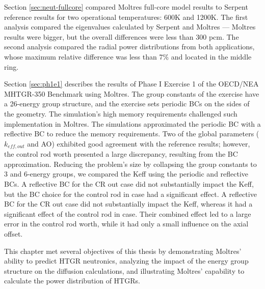 Section \ref{sec:neut-fullcore} compared Moltres full-core model results to Serpent reference results for two operational temperatures: 600K and 1200K.
The first analysis compared the eigenvalues calculated by Serpent and Moltres --- Moltres results were bigger, but the overall differences were less than 300 pcm.
The second analysis compared the radial power distributions from both applications, whose maximum relative difference was less than 7\% and located in the middle ring.

Section \ref{sec:ph1e1} describes the results of Phase I Exercise 1 of the OECD/NEA MHTGR-350 Benchmark using Moltres.
The group constants of the exercise have a 26-energy group structure, and the exercise sets periodic \glspl{BC} on the sides of the geometry.
The simulation's high memory requirements challenged such implementation in Moltres.
The simulations approximated the periodic BC with a reflective BC to reduce the memory requirements.
Two of the global parameters ($k_{eff,out}$ and AO) exhibited good agreement with the reference results; however, the control rod worth presented a large discrepancy, resulting from the BC approximation.
Reducing the problem's size by collapsing the group constants to 3 and 6-energy groups, we compared the \gls{Keff} using the periodic and reflective BCs.
A reflective BC for the \gls{CR} out case did not substantially impact the \gls{Keff}, but the BC choice for the control rod in case had a significant effect.
A reflective BC for the \gls{CR} out case did not substantially impact the \gls{Keff}, whereas it had a significant effect of the control rod in case.
Their combined effect led to a large error in the control rod worth, while it had only a small influence on the axial offset.

This chapter met several objectives of this thesis by demonstrating Moltres' ability to predict HTGR neutronics, analyzing the impact of the energy group structure on the diffusion calculations, and illustrating Moltres' capability to calculate the power distribution of HTGRs.
